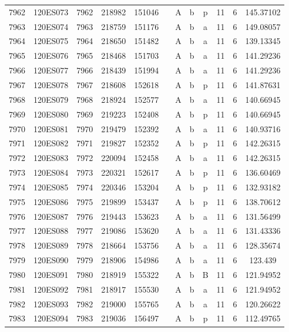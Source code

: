 \begin{tabular}{|*{12}{c|}}
7962 & 120ES073 & 7962 & 218982 & 151046 &  & A & b & p & 11 & 6 & 145.37102 \\ 
7963 & 120ES074 & 7963 & 218759 & 151176 &  & A & b & a & 11 & 6 & 149.08057 \\ 
7964 & 120ES075 & 7964 & 218650 & 151482 &  & A & b & a & 11 & 6 & 139.13345 \\ 
7965 & 120ES076 & 7965 & 218468 & 151703 &  & A & b & a & 11 & 6 & 141.29236 \\ 
7966 & 120ES077 & 7966 & 218439 & 151994 &  & A & b & a & 11 & 6 & 141.29236 \\ 
7967 & 120ES078 & 7967 & 218608 & 152618 &  & A & b & p & 11 & 6 & 141.87631 \\ 
7968 & 120ES079 & 7968 & 218924 & 152577 &  & A & b & a & 11 & 6 & 140.66945 \\ 
7969 & 120ES080 & 7969 & 219223 & 152408 &  & A & b & p & 11 & 6 & 140.66945 \\ 
7970 & 120ES081 & 7970 & 219479 & 152392 &  & A & b & a & 11 & 6 & 140.93716 \\ 
7971 & 120ES082 & 7971 & 219827 & 152352 &  & A & b & p & 11 & 6 & 142.26315 \\ 
7972 & 120ES083 & 7972 & 220094 & 152458 &  & A & b & a & 11 & 6 & 142.26315 \\ 
7973 & 120ES084 & 7973 & 220321 & 152617 &  & A & b & p & 11 & 6 & 136.60469 \\ 
7974 & 120ES085 & 7974 & 220346 & 153204 &  & A & b & p & 11 & 6 & 132.93182 \\ 
7975 & 120ES086 & 7975 & 219899 & 153437 &  & A & b & p & 11 & 6 & 138.70612 \\ 
7976 & 120ES087 & 7976 & 219443 & 153623 &  & A & b & a & 11 & 6 & 131.56499 \\ 
7977 & 120ES088 & 7977 & 219086 & 153620 &  & A & b & a & 11 & 6 & 131.43336 \\ 
7978 & 120ES089 & 7978 & 218664 & 153756 &  & A & b & a & 11 & 6 & 128.35674 \\ 
7979 & 120ES090 & 7979 & 218906 & 154986 &  & A & b & a & 11 & 6 & 123.439 \\ 
7980 & 120ES091 & 7980 & 218919 & 155322 &  & A & b & B & 11 & 6 & 121.94952 \\ 
7981 & 120ES092 & 7981 & 218917 & 155530 &  & A & b & a & 11 & 6 & 121.94952 \\ 
7982 & 120ES093 & 7982 & 219000 & 155765 &  & A & b & a & 11 & 6 & 120.26622 \\ 
7983 & 120ES094 & 7983 & 219036 & 156497 &  & A & b & p & 11 & 6 & 112.49765 \\ 

\end{tabular}
